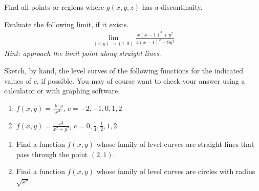 Find all points or regions where $g(x,y,z)$ has a discontinuity.
\item 
Evaluate the following limit, if it exists.
\begin{align*} 
\lim_{(x,y)\rightarrow(1,0) } \frac{x(x-1)^3 + y^2}{4(x-1)^2+9y^3}
\end{align*}
 \textit{Hint: approach the limit point along straight lines}.
\item 
Sketch, by hand, the level curves of the following functions for the indicated values of $c$, if possible. You may of course want to check your answer using a calculator or with graphing software. 
\begin{enumerate}
\item $f(x,y) =\frac{\ln y}{x^2} $, $c=-2, - 1, 0 , 1 , 2$
\item $f(x,y) = \frac{x^2}{x^2+y^2}$, $c=0,\frac{1}{4},\frac{1}{2},1,2$
\end{enumerate}
\item 
\begin{enumerate}
\item Find a function $f(x,y)$ whose family of level curves are straight lines that pass through the point $(2,1)$.
\item Find a function $f(x,y)$ whose family of level curves are circles with radius $\sqrt{e^c}$. 
\end{enumerate}

